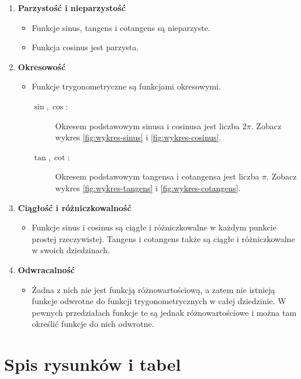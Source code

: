 \documentclass[a4paper,12pt]{article}
\begin{document}
\begin{enumerate}
    \item \textbf{Parzystość i nieparzystość}
    \begin{itemize}
        \item Funkcje sinus, tangens i cotangens są nieparzyste.
        \item Funkcja cosinus jest parzysta.
    \end{itemize}
    
    \item \textbf{Okresowość}
    \begin{itemize}
        \item Funkcje trygonometryczne są funkcjami okresowymi. 
        \begin{description}
            \item[$\sin, \cos$:] Okresem podstawowym sinusa i cosinusa jest liczba $2\pi$. Zobacz wykres \ref{fig:wykres-sinus} i \ref{fig:wykres-cosinus}.
            \item[$\tan, \cot$:] Okresem podstawowym tangensa i cotangensa jest liczba $\pi$. Zobacz wykres \ref{fig:wykres-tangens} i \ref{fig:wykres-cotangens}.
        \end{description}
    \end{itemize}
    
    \item \textbf{Ciągłość i różniczkowalność}
    \begin{itemize}
        \item Funkcje sinus i cosinus są ciągłe i różniczkowalne w każdym punkcie prostej rzeczywistej. Tangens i cotangens także są ciągłe i różniczkowalne w swoich dziedzinach.
    \end{itemize}

    \newpage
    
    \item \textbf{Odwracalność}
    \begin{itemize}
        \item Żadna z nich nie jest funkcją różnowartościową, a zatem nie istnieją funkcje odwrotne do funkcji trygonometrycznych w całej dziedzinie. W pewnych przedziałach funkcje te są jednak różnowartościowe i można tam określić funkcje do nich odwrotne.
    \end{itemize}
\end{enumerate}

\section{Spis rysunków i tabel}

\listoffigures
\listoftables
\end{document}
